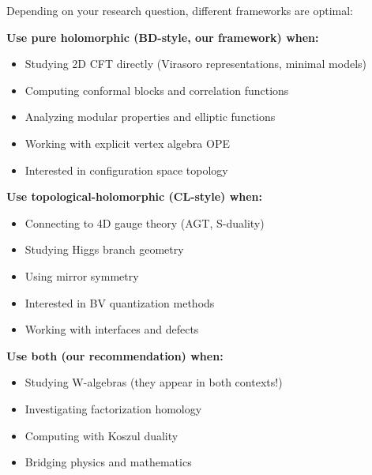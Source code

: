\begin{remark}\label{rem:framework-decision-tree}
Depending on your research question, different frameworks are optimal:

\textbf{Use pure holomorphic (BD-style, our framework) when:}
\begin{itemize}
\item Studying 2D CFT directly (Virasoro representations, minimal models)
\item Computing conformal blocks and correlation functions
\item Analyzing modular properties and elliptic functions
\item Working with explicit vertex algebra OPE
\item Interested in configuration space topology
\end{itemize}

\textbf{Use topological-holomorphic (CL-style) when:}
\begin{itemize}
\item Connecting to 4D gauge theory (AGT, S-duality)
\item Studying Higgs branch geometry
\item Using mirror symmetry
\item Interested in BV quantization methods
\item Working with interfaces and defects
\end{itemize}

\textbf{Use both (our recommendation) when:}
\begin{itemize}
\item Studying W-algebras (they appear in both contexts!)
\item Investigating factorization homology
\item Computing with Koszul duality
\item Bridging physics and mathematics
\end{itemize}
\end{remark}

